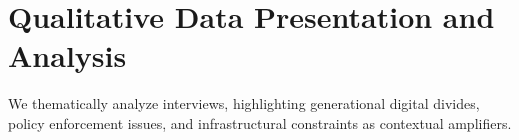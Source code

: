 \chapter{Qualitative Data Presentation and Analysis}
We thematically analyze interviews, highlighting generational digital divides, policy enforcement issues, and infrastructural constraints as contextual amplifiers.
